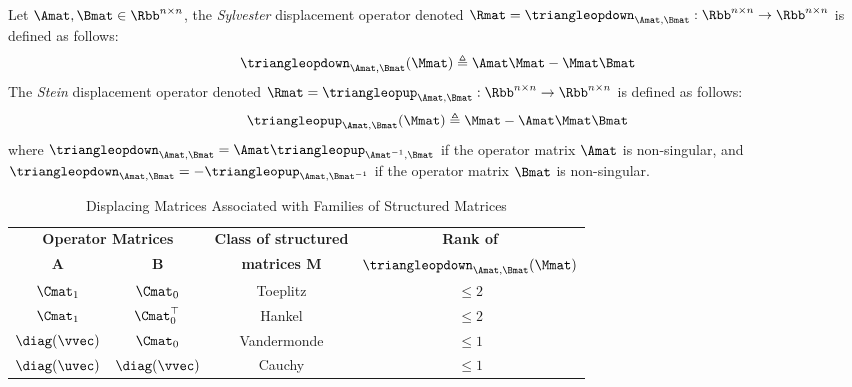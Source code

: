\begin{definition}
  Let $\Amat, \Bmat \in \Rbb^{n \times n}$, the \emph{Sylvester} displacement operator denoted $\Rmat = \triangleopdown_{\Amat, \Bmat}: \Rbb^{n \times n} \rightarrow \Rbb^{n \times n}$ is defined as follows:
  \begin{equation}
    \triangleopdown_{\Amat, \Bmat} (\Mmat) \triangleq \Amat \Mmat - \Mmat \Bmat
  \end{equation}
  The \emph{Stein} displacement operator denoted $\Rmat = \triangleopup_{\Amat, \Bmat}: \Rbb^{n \times n} \rightarrow \Rbb^{n \times n}$ is defined as follows:
  \begin{equation}
    \triangleopup_{\Amat, \Bmat} (\Mmat) \triangleq \Mmat - \Amat \Mmat \Bmat
  \end{equation}
  where $\triangleopdown_{\Amat, \Bmat} = \Amat \triangleopup_{\Amat^{-1}, \Bmat}$ if the operator matrix $\Amat$ is non-singular, and $\triangleopdown_{\Amat, \Bmat} = -\triangleopup_{\Amat, \Bmat^{-1}}$ if the operator matrix $\Bmat$ is non-singular.
\end{definition}
\begin{table}[t]
  \centering
  {\small
  \begin{tabular}{c|c|c|c}
    \toprule
    \multicolumn{2}{c|}{\textbf{Operator Matrices}} & \textbf{Class of structured} & \textbf{Rank of } \\
    \textbf{A} & \textbf{B} & \textbf{matrices M} & $\triangleopdown_{\Amat, \Bmat}(\Mmat)$ \\
    \midrule
    $\Cmat_1$                & $\Cmat_0$                & Toeplitz               & $\leq 2$ \\
    $\Cmat_1$                & $\Cmat_0^\top$           & Hankel                 & $\leq 2$ \\
    $\diag(\vvec)$           & $\Cmat_0$                & Vandermonde            & $\leq 1$ \\
    $\diag(\uvec)$           & $\diag(\vvec)$           & Cauchy                 & $\leq 1$ \\
    \bottomrule
  \end{tabular}
  }
  \caption{Displacing Matrices Associated with Families of Structured Matrices \cite{pan2001structured}}
  \label{table:ch2-displacing_matrices}
\end{table}

